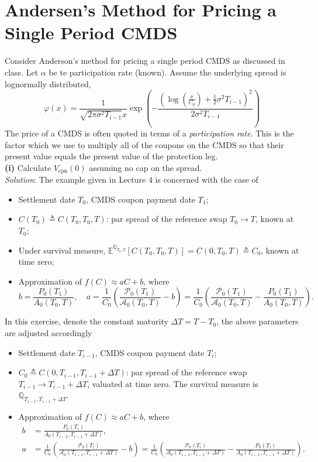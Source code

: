 \documentclass[paper=a4, fontsize=11pt]{scrartcl} %
\numberwithin{equation}{section} %
\numberwithin{figure}{section} %
\numberwithin{table}{section} %
\begin{document}
\newpage

\section{Andersen's Method for Pricing a Single Period CMDS}
Consider Anderson's method for pricing a single period CMDS as discussed in class.
Let $\alpha$ be te participation rate (known). Assume  the underlying spread is
lognormally distributed,
$$
\varphi(x) = \frac{1}{\sqrt{2\pi \sigma^2 T_{i-1}}x} \exp\left(
-\frac{\left( \log\left(\frac{x}{C_0}\right) + \frac{1}{2}\sigma^2 T_{i-1} \right)^2}{2\sigma^2 T_{i-1}}
\right)
$$
The price of a CMDS is often quoted in terms of a \textit{participation rate}. This is the factor which
we use to multiply all of the coupons on the CMDS so that their present value equals the present value
of the protection leg.\\
\textbf{(i)} Calculate $V_{\text{cpn}}(0)$ assuming no cap on the spread.\\
\textit{Solution}: The example given in Lecture 4 is concerned with the case of 
\begin{itemize}[noitemsep]
\item Settlement date $T_0$, CMDS coupon payment date $T_1$;
\item $C(T_0)\triangleq C(T_0,T_0,T)$: par spread of the reference swap $T_0\rightarrow T$, known at $T_0$;
\item Under survival measure, $\mathbb{E}^{\mathbb{Q}_{T_0,T}}[C(T_0,T_0,T)] = C(0,T_0,T)\triangleq C_0$, known at time zero;
\item Approximation of $f(C)\approx aC+b$, where
$$
b = \frac{P_0(T_1)}{A_0(T_0,T)}, \quad
a = \frac{1}{C_0}\left(\frac{\mathcal{P}_0(T_1)}{\mathcal{A}_0(T_0,T)}-b\right) = \frac{1 }{C_0}\left(\frac{\mathcal{P}_0(T_1)}{\mathcal{A}_0(T_0,T)}- \frac{P_0(T_1)}{A_0(T_0,T)}\right).
$$
\end{itemize}
In this exercise, denote the constant maturity $\Delta T = T-T_0$, the above parameters are adjusted accordingly
\begin{itemize}[noitemsep]
\item Settlement date $T_{i-1}$, CMDS coupon payment date $T_i$;
\item $C_0\triangleq C(0,T_{i-1},T_{i-1}+\Delta T)$: par spread of the reference swap $T_{i-1}\rightarrow T_{i-1}+\Delta T$, valuated at time zero. The survival measure is $\mathbb{Q}_{T_{i-1},T_{i-1}+\Delta T}$.
\item Approximation of $f(C)\approx aC+b$, where
\begin{align*}
b &= \frac{P_0(T_i)}{A_0(T_{i-1}, T_{i-1}+\Delta T)},\\
a &= \frac{1}{C_0}\left(\frac{\mathcal{P}_0(T_i)}{\mathcal{A}_0(T_{i-1}, T_{i-1}+\Delta T)}-b\right) = \frac{1 }{C_0}\left(
\frac{\mathcal{P}_0(T_i)}{\mathcal{A}_0(T_{i-1}, T_{i-1}+\Delta T)}- \frac{P_0(T_i)}{A_0(T_{i-1}, T_{i-1}+\Delta T)}\right).
\end{align*}
\end{itemize}
\end{document}
